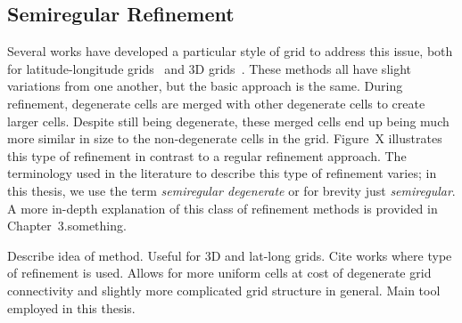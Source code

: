 \subsection{Semiregular Refinement}
Several works have developed a particular style of grid to address this issue, both for latitude-longitude grids~\cite{leopardi2006partition, sun2008global} and 3D grids~\cite{yu2009sdog, gang2013sphere, wang2013global}\cite{others}.
These methods all have slight variations from one another, but the basic approach is the same.
During refinement, degenerate cells are merged with other degenerate cells to create larger cells. %
Despite still being degenerate, these merged cells end up being much more similar in size to the non-degenerate cells in the grid.
Figure~X illustrates this type of refinement in contrast to a regular refinement approach.
The terminology used in the literature to describe this type of refinement varies; in this thesis, we use the term \textit{semiregular degenerate} or for brevity just \textit{semiregular}.
A more in-depth explanation of this class of refinement methods is provided in Chapter~3.something.



Describe idea of method.
Useful for 3D and lat-long grids.
Cite works where type of refinement is used.
Allows for more uniform cells at cost of degenerate grid connectivity and slightly more complicated grid structure in general.
Main tool employed in this thesis.
